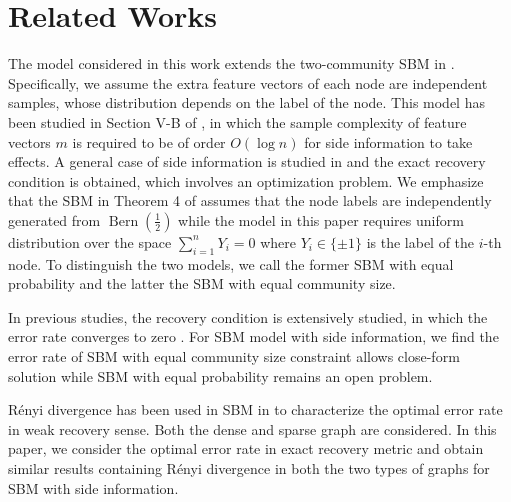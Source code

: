 \documentclass[conference,letterpaper]{IEEEtran}
\DeclareMathOperator{\Bern}{Bern}
\begin{document}
\section{Related Works}\label{s:rw}
The model considered in this work extends the two-community SBM in \cite{abbe2015community}.
Specifically, we assume the extra feature vectors of each node are independent samples, whose distribution depends on the label of the node.
This model has been studied in Section V-B of \cite{saad2018community}, in which the sample complexity of feature vectors
$m$ is required to be of order $O(\log n)$ for side information to take effects.
A general case of side information is studied
in \cite{abbe17sideinfo} and the exact recovery condition is obtained, which involves an optimization problem.
We emphasize that the SBM in Theorem 4 of \cite{abbe17sideinfo}
assumes that the node labels are independently generated  from $\Bern(\frac{1}{2})$ while the model
in this paper requires uniform distribution over the space $\sum_{i=1}^n Y_i = 0$ where $Y_i \in \{\pm 1 \}$ is the label of the $i$-th node.
To distinguish the two models, we call the former SBM with equal probability
and the latter the SBM with equal community size.

In previous studies, the recovery condition is extensively studied, in which the error rate converges
to zero \cite{abbe2015exact}. 
For SBM model with side information, we find the error rate of SBM with equal community size constraint allows close-form solution while SBM with
equal probability remains an open problem.

Rényi divergence has been used in SBM in \cite{zhang2016} to characterize the optimal error rate in weak
recovery sense. Both the dense and sparse graph are considered. In this paper, we consider the optimal error rate in exact recovery metric and obtain similar results containing
Rényi divergence
in both the two types of graphs for SBM with side information.
\end{document}
